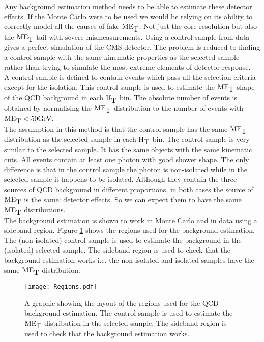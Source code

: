 Any background estimation method needs to be able to estimate these detector 
effects. If the Monte Carlo were to be used we would be relying on its ability 
to correctly model all the causes of fake $\mbox{ME}_{\mbox{T}}$. Not just the core resolution 
but also the $\mbox{ME}_{\mbox{T}}$ tail with severe mismeasurements. Using a control sample 
from data gives a perfect simulation of the CMS detector. The problem is reduced
to finding a control sample with the same kinematic properties as the selected 
sample rather than trying to simulate the most extreme elements of detector
response. \\

A control sample is defined to contain events which pass all the selection 
criteria except for the isolation. This control sample is used to estimate the
$\mbox{ME}_{\mbox{T}}$ shape of the QCD background in each $\mbox{H}_{\mbox{T}}$ bin. The absolute number of
events is obtained by normalising the $\mbox{ME}_{\mbox{T}}$ distribution to the number of
events with $\mbox{ME}_{\mbox{T}} < 50 \mbox{GeV}$. \\

The assumption in this method is that the control sample has the same $\mbox{ME}_{\mbox{T}}$
distribution as the selected sample in each $\mbox{H}_{\mbox{T}}$ bin. The control sample is
very similar to the selected sample. It has the same objects with the same
kinematic cuts. All events contain at least one photon with good shower shape.
The only difference is that in the control sample the photon is non-isolated
while in the selected sample it happens to be isolated. Although they contain
the three sources of QCD background in different proportions, in both cases the 
source of $\mbox{ME}_{\mbox{T}}$ is the same: detector effects. So we can expect them to have 
the same $\mbox{ME}_{\mbox{T}}$ distributions. \\

The background estimation is shown to work in Monte Carlo and in data using a 
sideband region. Figure \ref{fig:Regions} shows the regions used for the
background estimation. The (non-isolated) control sample is used to estimate the 
background in the (isolated) selected sample. The sideband region is used to
check that the background estimation works i.e. the non-isolated and isolated 
samples have the same $\mbox{ME}_{\mbox{T}}$ distribution. \\

\begin{figure}
\begin{center}
\texttt{[image: Regions.pdf]}
\end{center}
\caption{A graphic showing the layout of the regions used for the QCD background
estimation. The control sample is used to estimate the $\mbox{ME}_{\mbox{T}}$ distribution in
the selected sample. The sideband region is used to check that the background
estimation works.}
\label{fig:Regions}
\end{figure}

